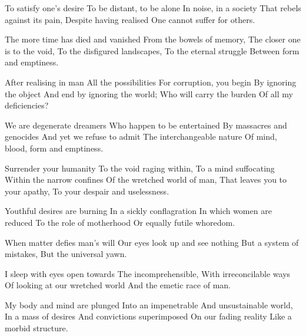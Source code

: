 \documentclass{article}
\newenvironment{stanza}{\begin{minipage}{10cm}\obeylines}{\end{minipage}\vspace{\baselineskip}}
\begin{document}
\begin{stanza}
To satisfy one's desire
To be distant, to be alone
In noise, in a society
That rebels against its pain,
Despite having realised
One cannot suffer for others.
\end{stanza}

\begin{stanza}
The more time has died and vanished
From the bowels of memory,
The closer one is to the void,
To the disfigured landscapes,
To the eternal struggle
Between form and emptiness.
\end{stanza}

\begin{stanza}
After realising in man
All the possibilities
For corruption, you begin
By ignoring the object
And end by ignoring the world;
Who will carry the burden
Of all my deficiencies?
\end{stanza}

\begin{stanza}
We are degenerate dreamers
Who happen to be entertained
By massacres and genocides
And yet we refuse to admit
The interchangeable nature
Of mind, blood, form and emptiness.
\end{stanza}

\begin{stanza}
Surrender your humanity
To the void raging within,
To a mind suffocating
Within the narrow confines
Of the wretched world of man,
That leaves you to your apathy,
To your despair and uselessness.
\end{stanza}

\begin{stanza}
Youthful desires are burning
In a sickly conflagration
In which women are reduced
To the role of motherhood
Or equally futile whoredom.
\end{stanza}

\begin{stanza}
When matter defies man's will
Our eyes look up and see nothing
But a system of mistakes,
But the universal yawn.
\end{stanza}

\begin{stanza}
I sleep with eyes open towards
The incomprehensible,
With irreconcilable ways
Of looking at our wretched world
And the emetic race of man.
\end{stanza}

\begin{stanza}
My body and mind are plunged
Into an impenetrable
And unsustainable world,
In a mass of desires
And convictions superimposed
On our fading reality
Like a morbid structure.
\end{stanza}
\end{document}
